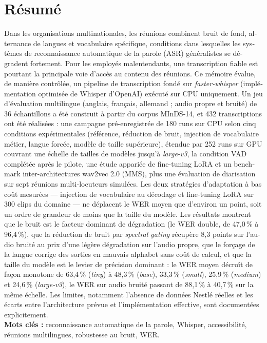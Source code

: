 \documentclass[12pt]{report}
\begin{document}
\section*{Résumé}
\begin{otherlanguage}{french}
Dans les organisations multinationales, les réunions combinent bruit de fond, alternance de langues et vocabulaire spécifique, conditions dans lesquelles les systèmes de reconnaissance automatique de la parole (ASR) généralistes se dégradent fortement. Pour les employés malentendants, une transcription fiable est pourtant la principale voie d'accès au contenu des réunions. Ce mémoire évalue, de manière contrôlée, un pipeline de transcription fondé sur \textit{faster-whisper} (implémentation optimisée de Whisper d'OpenAI) exécuté sur CPU uniquement. Un jeu d'évaluation multilingue (anglais, français, allemand ; audio propre et bruité) de 36 échantillons a été construit à partir du corpus MInDS-14, et 432 transcriptions ont été réalisées : une campagne pré-enregistrée de 180 runs sur CPU selon cinq conditions expérimentales (référence, réduction de bruit, injection de vocabulaire métier, langue forcée, modèle de taille supérieure), étendue par 252 runs sur GPU couvrant une échelle de tailles de modèles jusqu'à \textit{large-v3}, la condition VAD complétée après le pilote, une étude appariée de fine-tuning LoRA et un benchmark inter-architectures wav2vec 2.0 (MMS), plus une évaluation de diarisation sur sept réunions multi-locuteurs simulées. Les deux stratégies d'adaptation à bas coût mesurées --- injection de vocabulaire au décodage et fine-tuning LoRA sur 300 clips du domaine --- ne déplacent le WER moyen que d'environ un point, soit un ordre de grandeur de moins que la taille du modèle. Les résultats montrent que le bruit est le facteur dominant de dégradation (le WER double, de 47{,}0\,\% à 96{,}4\,\%), que la réduction de bruit par \textit{spectral gating} récupère 8{,}3 points sur l'audio bruité au prix d'une légère dégradation sur l'audio propre, que le forçage de la langue corrige des sorties en mauvais alphabet sans coût de calcul, et que la taille du modèle est le levier de précision dominant : le WER moyen décroît de façon monotone de 63{,}4\,\% (\textit{tiny}) à 48{,}3\,\% (\textit{base}), 33{,}3\,\% (\textit{small}), 25{,}9\,\% (\textit{medium}) et 24{,}6\,\% (\textit{large-v3}), le WER sur audio bruité passant de 88{,}1\,\% à 40{,}7\,\% sur la même échelle. Les limites, notamment l'absence de données Nestlé réelles et les écarts entre l'architecture prévue et l'implémentation effective, sont documentées explicitement.
\\
\textbf{Mots clés :} reconnaissance automatique de la parole, Whisper, accessibilité, réunions multilingues, robustesse au bruit, WER.
\end{otherlanguage}
\thispagestyle{fancy}
\newpage
\end{document}
